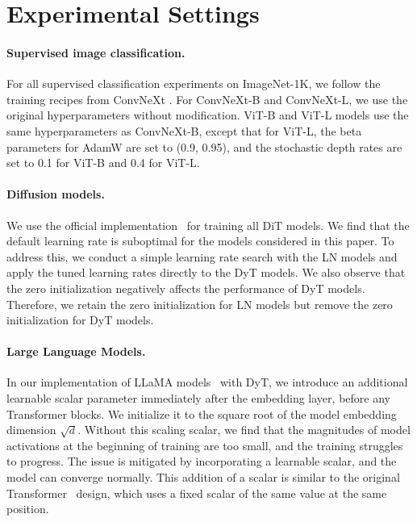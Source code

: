 \appendix


\section{Experimental Settings}
\label{section:reproduce}

\paragraph{Supervised image classification.} For all supervised classification experiments on ImageNet-1K, we follow the training recipes from ConvNeXt \citep{convnext}.
For ConvNeXt-B and ConvNeXt-L, we use the original hyperparameters without modification.
ViT-B and ViT-L models use the same hyperparameters as ConvNeXt-B, except that for ViT-L, the beta parameters for AdamW are set to (0.9, 0.95), and the stochastic depth rates are set to 0.1 for ViT-B and 0.4 for ViT-L. 

\paragraph{Diffusion models.} We use the official implementation~\citep{dit} for training all DiT models. We find that the default learning rate is suboptimal for the models considered in this paper. To address this, we conduct a simple learning rate search with the LN models and apply the tuned learning rates directly to the DyT models. We also observe that the zero initialization negatively affects the performance of DyT models. Therefore, we retain the zero initialization for LN models but remove the zero initialization for DyT models.

\paragraph{Large Language Models.} In our implementation of LLaMA models~\citep{touvron2023llama, touvron2023llama2, dubey2024llama} with DyT, we introduce an additional learnable scalar parameter immediately after the embedding layer, before any Transformer blocks. We initialize it to the square root of the model embedding dimension $\sqrt{d}$. Without this scaling scalar, we find that the magnitudes of model activations at the beginning of training are too small, and the training struggles to progress. The issue is mitigated by incorporating a learnable scalar, and the model can converge normally. This addition of a scalar is similar to the original Transformer~\citep{vaswani2017attention} design, which uses a fixed scalar of the same value at the same position.

